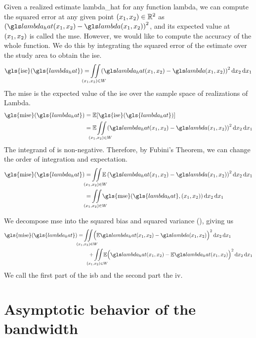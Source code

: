 Given a realized estimate \gls{lambda_hat} for any function \gls{lambda},
we can compute the squared error at any given point $(x_1, x_2) \in \mathbb{R}^2$ as
$\left( \lmbdhat - \lmbd \right)^2$,
and its expected value at $(x_1, x_2)$ is called the \gls{mse}.
However,
we would like to compute the accuracy of the whole function.
We do this by integrating the squared error of the estimate over the study area to obtain the \gls{ise}.
\begin{equation}
\label{eq:ise}
    \mbox{\gls{ise}}(\gls{lambda_hat}) = \iintW{
            \left( \lmbdhat - \lmbd \right)^2
    }
\end{equation}
The \gls{mise} is the expected value of the \gls{ise} over the sample space of realizations of \gls{Lambda}.
\begin{align}
    \mbox{\gls{mise}}(\gls{lambda_hat}) 
        & = \E [\mbox{\gls{ise}}(\gls{lambda_hat})] \nonumber \\
        & = \E \iintW{ \left( \lmbdhat - \lmbd \right)^2 } \label{eq:mise}
\end{align}
The integrand of  is non-negative.
Therefore, by Fubini's Theorem, we can change the order of integration and expectation.
\begin{align}
    \mbox{\gls{mise}}(\gls{lambda_hat}) 
        & = \iintW{ \E \left( \lmbdhat - \lmbd \right)^2 } \nonumber \\
        & = \iintW{ \mbox{\gls{mse}}(\gls{lambda_hat}, \xvec) } \nonumber
\end{align}

We decompose \gls{mse} into the squared bias and squared variance (),
giving us
\begin{align}
    \mbox{\gls{mise}}(\gls{lambda_hat}) 
        & = \iintW{ \Big( \E\lmbdhat - \lmbd \Big)^2 } \nonumber \\
        & \qquad + \iintW{ \E \Big( \lmbdhat - \E\lmbdhat \Big)^2 } \label{eq:mise:intbiasvariance}
\end{align}
We call the first part of  the \gls{isb} and the second part the \gls{iv}.

\section{Asymptotic behavior of the bandwidth}
\label{sec:theory:asymptotic_bandwidth}

